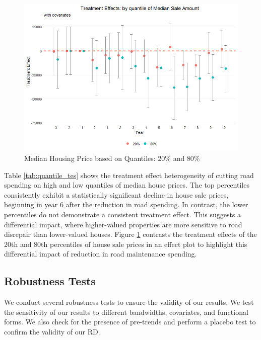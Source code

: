\begin{figure}[htbp]
    \centering
    \includegraphics[width=\textwidth,keepaspectratio]{images/tes_qte_re.png}    
    \caption{Median Housing Price based on Quantiles: 20\% and 80\%}
    \label{fig:tes_qte_covs}
\end{figure}

Table \ref{tab:quantile_tes} shows the treatment effect heterogeneity of cutting road spending on high and low quantiles of median house prices. The top percentiles consistently exhibit a statistically significant decline in house sale prices, beginning in year 6 after the reduction in road spending. In contrast, the lower percentiles do not demonstrate a consistent treatment effect. This suggests a differential impact, where higher-valued properties are more sensitive to road disrepair than lower-valued houses. Figure \ref{fig:tes_qte_covs} contrasts the treatment effects of the 20th and 80th percentiles of house sale prices in an effect plot to highlight this differential impact of reduction in road maintenance spending.

\subsection{Robustness Tests}

We conduct several robustness tests to ensure the validity of our results. We test the sensitivity of our results to different bandwidths, covariates, and functional forms. We also check for the presence of pre-trends and perform a placebo test to confirm the validity of our RD.

